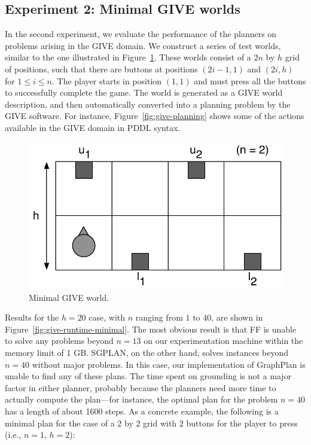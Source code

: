 \documentclass[letterpaper]{article}
\begin{document}
\subsection{Experiment 2: Minimal GIVE worlds}
\label{sec:exper-2:-minim}

In the second experiment, we evaluate the performance of the planners on
problems arising in the GIVE domain. We construct a series of test worlds,
similar to the one illustrated in Figure~\ref{fig:give-minimal}. These
worlds consist of a $2n$ by $h$ grid of positions, such that there are
buttons at positions $(2i-1,1)$ and $(2i,h)$ for $1 \leq i \leq n$. The
player starts in position $(1,1)$ and must press all the buttons
to successfully complete the game. The world is generated as a GIVE world
description, and then automatically converted into a planning problem by
the GIVE software. For instance, Figure~\ref{fig:give-planning} shows some
of the actions available in the GIVE domain in PDDL syntax.

\begin{figure}[t]
  \centering
  \includegraphics[width=0.5\columnwidth]{pic-buttons}
  \caption{Minimal GIVE world.}
  \label{fig:give-minimal}
\end{figure}

Results for the $h=20$ case, with $n$ ranging from $1$ to $40$, are shown
in Figure~\ref{fig:give-runtime-minimal}. The most obvious result is that
FF is unable to solve any problems beyond $n=13$ on our experimentation
machine within the memory limit of 1 GB. SGPLAN, on the other hand, solves
instances beyond $n=40$ without major problems. In this case, our
implementation of GraphPlan is unable to find any of these plans. The time
spent on grounding is not a major factor in either planner, probably
because the planners need more time to actually compute the plan---for
instance, the optimal plan for the problem $n=40$ has a length of about
1600 steps. As a concrete example, the following is a minimal plan for the
case of a $2$ by $2$ grid with $2$ buttons for the player to press (i.e.,
$n=1$, $h=2$):
\end{document}
